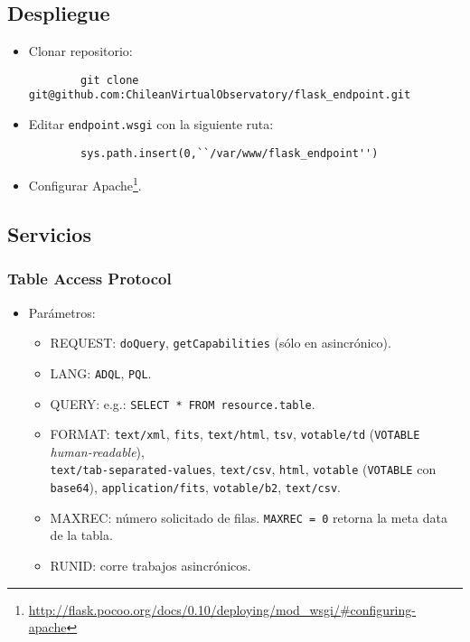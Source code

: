 \subsection*{Despliegue}

\begin{itemize}
	\item Clonar repositorio:
		\begin{verbatim}
		git clone git@github.com:ChileanVirtualObservatory/flask_endpoint.git
	\end{verbatim}
	\item Editar \verb;endpoint.wsgi; con la siguiente ruta:
		\begin{verbatim}
		sys.path.insert(0,``/var/www/flask_endpoint'')
	\end{verbatim}
	\item Configurar Apache\footnote{\url{http://flask.pocoo.org/docs/0.10/deploying/mod\_wsgi/\#configuring-apache}}.
\end{itemize}

\subsection*{Servicios}

\subsubsection*{{\sc Table Access Protocol}}

\begin{itemize}
	\item Parámetros:
		\begin{itemize}
			\item REQUEST: \verb;doQuery;, \verb;getCapabilities; (sólo en asincrónico).
			\item LANG: \verb;ADQL;, \verb;PQL;.
			\item QUERY: e.g.: \verb;SELECT * FROM resource.table;.
			\item FORMAT: \verb;text/xml;, \verb;fits;, \verb;text/html;, \verb;tsv;, \verb;votable/td; (\verb;VOTABLE; \emph{human-readable}), \\ \verb;text/tab-separated-values;, \verb;text/csv;, \verb;html;, \verb;votable; (\verb;VOTABLE; con \verb;base64;), \verb;application/fits;, \verb;votable/b2;, \verb;text/csv;.
			\item MAXREC: número solicitado de filas. \verb;MAXREC = 0; retorna la meta data de la tabla.
			\item RUNID: corre trabajos asincrónicos.
		\end{itemize}
\end{itemize}


